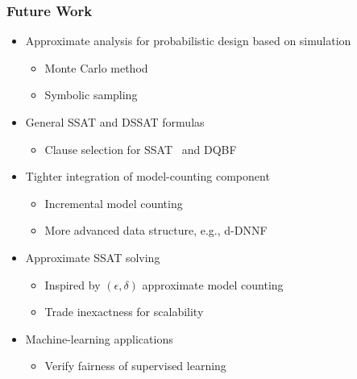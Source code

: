 \begin{frame}
      \frametitle{Future Work}
      \begin{itemize}
            \item Approximate analysis for probabilistic design based on simulation
                  \begin{itemize}
                        \item Monte Carlo method
                        \item Symbolic sampling~\cite{KravetsDAC19ECOSampling}
                  \end{itemize}
                  \pause
            \item General SSAT and DSSAT formulas
                  \begin{itemize}
                        \item Clause selection for SSAT~\cite{Chen2021} and DQBF~\cite{Tentrup2019}
                  \end{itemize}
                  \pause
            \item Tighter integration of model-counting component
                  \begin{itemize}
                        \item Incremental model counting
                        \item More advanced data structure, e.g., d-DNNF~\cite{Darwiche2002dDNNF}
                  \end{itemize}
                  \pause
            \item Approximate SSAT solving
                  \begin{itemize}
                        \item Inspired by $(\epsilon,\delta)$ approximate model counting
                        \item Trade inexactness for scalability
                  \end{itemize}
                  \pause
            \item Machine-learning applications
                  \begin{itemize}
                        \item Verify fairness of supervised learning~\cite{Ghosh2021}
                  \end{itemize}
      \end{itemize}
\end{frame}
